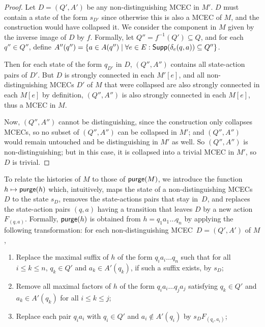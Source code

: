 \documentclass[a4paper,USenglish,cleveref, autoref, thm-restate]{lipics-v2021}
\newcommand\Supp{\textrm{\sf Supp}}
\newcommand\freshaction[1]{F_{#1}}
\newcommand\purge[1]{\textrm{\sf purge}(#1)}
\begin{document}
\begin{proof}
  Let $D=(Q',A')$ be any non-distinguishing MCEC in $M'$. 
  $D$ must contain a state of the form $s_{D'}$ since otherwise this is also a MCEC of $M$, and the construction would have collapsed it.
  We consider the component in $M$ given by the inverse image of $D$ by $f$.
  Formally, let $Q''=f^{-1}(Q') \subseteq Q$, and for each $q'' \in Q''$, define
  $A''(q'') = \{ a \in A(q'') \mid \forall e \in E: \Supp(\delta_e(q,a)) \subseteq Q''\}$.
  
  Then for each state of the form $q_{D'}$ in $D$, $(Q'',A'')$ contains all state-action pairs of $D'$.
  But $D$ is strongly connected in each $M'[e]$, and all non-distinguishing MCECs $D'$ of $M$ that were collapsed are
  also strongly connected in each $M[e]$ by definition, $(Q'',A'')$ is also strongly connected in each $M[e]$, thus
  a MCEC in $M$.

  Now, $(Q'',A'')$ cannot be distinguishing, since the construction only collapses MCECs, so no subset of $(Q'',A'')$
  can be collapsed in $M'$; and $(Q'',A'')$ would remain untouched and be distinguishing in $M'$ as well.
  So $(Q'',A'')$ is non-distinguishing; but in this case, it is collapsed into a trivial MCEC in $M'$, so $D$ is trivial.  
\end{proof}

To relate the histories of $M$ to those of $\purge{M}$, we introduce the function $h\mapsto \purge{h}$ which, 
intuitively, maps the state of a non-distinguishing MCECs $D$ to the state $s_D$,
removes the state-actions pairs that stay in~$D$, and replaces the state-action pairs $(q,a)$ having a transition that leaves $D$ by a new action $\freshaction{(q,a)}$.
Formally, $\purge{h}$ is obtained from $h=q_1a_1\ldots q_n$ by applying the following transformation:
for each non-distinguishing MCEC~$D=(Q',A')$ of $M$,
\begin{enumerate}
  \item Replace the maximal suffix of $h$ of the form $q_ia_i\ldots q_n$
  such that for all $i\leq k \leq n$, $q_k\in Q'$ and $a_k\in A'(q_k)$, 
  if such a suffix exists, by $s_D$;
  \item Remove all maximal factors of $h$ of the form $q_ia_i\ldots q_ja_j$
  satisfying $q_k \in Q'$ and $a_k\in A'(q_k)$ for all $i \leq k \leq j$;
  \item Replace each pair $q_ia_i$ with $q_i \in Q'$ and $a_i \not \in A'(q_i)$ by $s_D \freshaction{(q_i,a_i)}$;    
\end{enumerate} 
\end{document}
